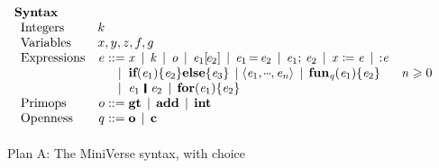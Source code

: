 \begin{figure}
  $$
  \begin{array}{l}
    \textbf{Syntax} \\
    \begin{array}{lr@{\;}r@{\;}ll}
    \text{Integers} & k \\
    \text{Variables} & \multicolumn{3}{l}{x,y,z,f,g} \\
    \text{Expressions} & e  & ::=  &
        \ensuremath{\Varid{x}}
    \vb \ensuremath{\Varid{k}}
    \vb \ensuremath{\Varid{o}}
    \vb \ensuremath{\Varid{e}_{\mathrm{1}} [\!\Varid{e}_{\mathrm{2}}]}
    \vb \ensuremath{\Varid{e}_{\mathrm{1}}\hspace{-0.14em}=\hspace{-0.14em}\Varid{e}_{\mathrm{2}}}
    \vb \ensuremath{\Varid{e}_{\mathrm{1}};\,\Varid{e}_{\mathrm{2}}}
    \vb \ensuremath{\Varid{x}\mathrel{\coloneqq}\Varid{e}}
    \vb \ensuremath{\mathbin{:}\Varid{e}}
    \\
    & &
    \vb & \ensuremath{\textbf{if}(\Varid{e}_{\mathrm{1}})\{\Varid{e}_{\mathrm{2}}\}\textbf{else}\{\Varid{e}_{\mathrm{3}}\}}
    \vb \ensuremath{\langle\Varid{e}_{\mathrm{1}},\mydots,\Varid{e}_{\Varid{n}}\rangle}
    \vb \ensuremath{\textbf{fun}_\Varid{q}(\Varid{e}_{\mathrm{1}})\{\Varid{e}_{\mathrm{2}}\}}
    & \ensuremath{\Varid{n}\geq \mathrm{0}}
    \\
    & & \vb & \ensuremath{\Varid{e}_{\mathrm{1}}\hspace{0.19em}\mathop{\rule[-0.1em]{0.15em}{0.75em}}\hspace{0.2em}\Varid{e}_{\mathrm{2}}} \vb \ensuremath{\textbf{for}(\Varid{e}_{\mathrm{1}})\{\Varid{e}_{\mathrm{2}}\}}
    \\
    \text{Primops} & o  & ::= & \ensuremath{\textbf{gt}} \vb \ensuremath{\textbf{add}} \vb \ensuremath{\textbf{int}} \\
    \text{Openness} & q & ::= & \ensuremath{\textbf{o}} \vb \ensuremath{\textbf{c}} \\
    \end{array} \\
    \\[-3mm]
  \end{array}
  $$
\caption{Plan A: The MiniVerse syntax, with choice} \label{fig:syntax}
\end{figure}

\newcommand{\LblsValue}{LW}
\newcommand{\semfcnc}{\Value \rightharpoonup \LblsValue}
\newcommand{\Ltag}{\textbf{L}}
\newcommand{\Rtag}{\textbf{R}}
\newcommand{\mtypec}{LW^{*}}
\newcommand{\capu}{\cap\hspace{-0.6em}\bullet\,}
\newcommand{\prelbl}{\textbf{prelbl}}
\newcommand{\unlbl}{\textbf{unlbl}}
\newcommand{\LblValue}{LW}
\newcommand{\Lbl}{\mathbf{Lbl}}
\newcommand{\lblemp}{\epsilon}
\newcommand{\lbll}[1]{{\bf L}\;#1}
\newcommand{\lblr}[1]{{\bf R}\;#1}
\newcommand{\lblseq}[2]{#1 \sconcat #2}
\newcommand{\sortlbl}{\textbf{sortLbl}}


